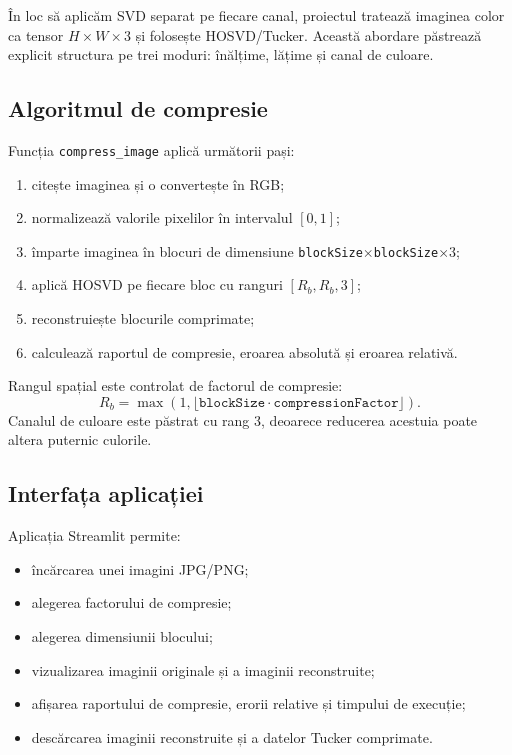 \documentclass[12pt,a4paper]{article}
\theoremstyle{definition}
\begin{document}
În loc să aplicăm SVD separat pe fiecare canal, proiectul tratează imaginea color ca tensor $H\times W\times 3$ și folosește HOSVD/Tucker. Această abordare păstrează explicit structura pe trei moduri: înălțime, lățime și canal de culoare.

\subsection{Algoritmul de compresie}

Funcția \texttt{compress\_image} aplică următorii pași:
\begin{enumerate}
  \item citește imaginea și o convertește în RGB;
  \item normalizează valorile pixelilor în intervalul $[0,1]$;
  \item împarte imaginea în blocuri de dimensiune \texttt{blockSize}$\times$\texttt{blockSize}$\times 3$;
  \item aplică HOSVD pe fiecare bloc cu ranguri $[R_b,R_b,3]$;
  \item reconstruiește blocurile comprimate;
  \item calculează raportul de compresie, eroarea absolută și eroarea relativă.
\end{enumerate}

Rangul spațial este controlat de factorul de compresie:
\[
  R_b = \max(1,\lfloor \texttt{blockSize}\cdot \texttt{compressionFactor}\rfloor).
\]
Canalul de culoare este păstrat cu rang $3$, deoarece reducerea acestuia poate altera puternic culorile.

\subsection{Interfața aplicației}

Aplicația Streamlit permite:
\begin{itemize}
  \item încărcarea unei imagini JPG/PNG;
  \item alegerea factorului de compresie;
  \item alegerea dimensiunii blocului;
  \item vizualizarea imaginii originale și a imaginii reconstruite;
  \item afișarea raportului de compresie, erorii relative și timpului de execuție;
  \item descărcarea imaginii reconstruite și a datelor Tucker comprimate.
\end{itemize}
\end{document}
